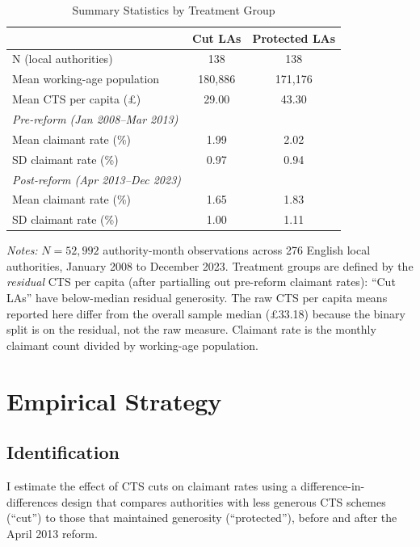 \documentclass[12pt]{article}
\begin{document}
\begin{table}[H]
\centering
\caption{Summary Statistics by Treatment Group}
\label{tab:summary}
\begin{threeparttable}
\begin{tabular}{lcc}
\toprule
& Cut LAs & Protected LAs \\
\midrule
N (local authorities) & 138 & 138 \\
Mean working-age population & 180,886 & 171,176 \\
Mean CTS per capita (\pounds) & 29.00 & 43.30 \\
\addlinespace
\emph{Pre-reform (Jan 2008--Mar 2013)} & & \\
\quad Mean claimant rate (\%) & 1.99 & 2.02 \\
\quad SD claimant rate (\%) & 0.97 & 0.94 \\
\addlinespace
\emph{Post-reform (Apr 2013--Dec 2023)} & & \\
\quad Mean claimant rate (\%) & 1.65 & 1.83 \\
\quad SD claimant rate (\%) & 1.00 & 1.11 \\
\bottomrule
\end{tabular}
\begin{tablenotes}[flushleft]
\small
\item \emph{Notes:} $N = 52{,}992$ authority-month observations across 276 English local authorities, January 2008 to December 2023. Treatment groups are defined by the \emph{residual} CTS per capita (after partialling out pre-reform claimant rates): ``Cut LAs'' have below-median residual generosity. The raw CTS per capita means reported here differ from the overall sample median (\pounds 33.18) because the binary split is on the residual, not the raw measure. Claimant rate is the monthly claimant count divided by working-age population.
\end{tablenotes}
\end{threeparttable}
\end{table}



\section{Empirical Strategy}

\subsection{Identification}

I estimate the effect of CTS cuts on claimant rates using a difference-in-differences design that compares authorities with less generous CTS schemes (``cut'') to those that maintained generosity (``protected''), before and after the April 2013 reform.
\end{document}
